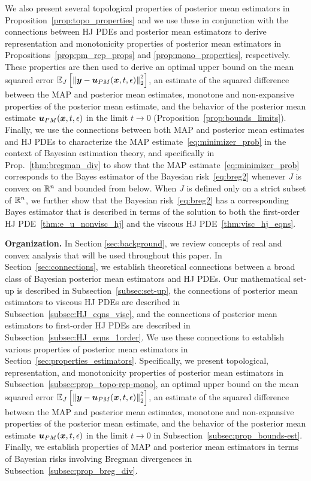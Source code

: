 We also present several topological properties of posterior mean estimators in Proposition~\ref{prop:topo_properties} and we use these in conjunction with the connections between HJ PDEs and posterior mean estimators to derive representation and monotonicity properties of posterior mean estimators in Propositions~\ref{prop:pm_rep_props} and \ref{prop:mono_properties}, respectively. These properties are then used to derive an optimal upper bound on the mean squared error $\mathbb{E}_{J}\left [{\left\Vert{\boldsymbol{y}-\boldsymbol{u}_{PM}(\boldsymbol{x},t,\epsilon)} \right\Vert_{2}^{2}}\right]$, an estimate of the squared difference between the MAP and posterior mean estimates, monotone and non-expansive properties of the posterior mean estimate, and the behavior of the posterior mean estimate $\boldsymbol{u}_{PM}(\boldsymbol{x},t,\epsilon)$ in the limit $t \to 0$ (Proposition~\ref{prop:bounds_limits}). Finally, we use the connections between both MAP and posterior mean estimates and HJ PDEs to characterize the MAP estimate~\eqref{eq:minimizer_prob} in the context of Bayesian estimation theory, and specifically in Prop.~\ref{thm:bregman_div} to show that the MAP estimate~\eqref{eq:minimizer_prob} corresponds to the Bayes estimator of the Bayesian risk~\eqref{eq:breg2} whenever $J$ is convex on $\mathbb{R}^n$ and bounded from below. When $J$ is defined only on a strict subset of $\mathbb{R}^n$, we further show that the Bayesian risk~\eqref{eq:breg2} has a corresponding Bayes estimator that is described in terms of the solution to both the first-order HJ PDE~\eqref{thm:e_u_nonvisc_hj} and the viscous HJ PDE~\eqref{thm:visc_hj_eqns}.

\bigbreak
\noindent
\textbf{Organization.} 
In Section \ref{sec:background}, we review concepts of real and convex analysis that will be used throughout this paper. In Section~\ref{sec:connections}, we establish theoretical connections between a broad class of Bayesian posterior mean estimators and HJ PDEs. Our mathematical set-up is described in Subsection~\ref{subsec:set-up}, the connections of posterior mean estimators to viscous HJ PDEs are described in Subsection~\ref{subsec:HJ_eqns_visc}, and the connections of posterior mean estimators to first-order HJ PDEs are described in Subsection~\ref{subsec:HJ_eqns_1order}. We use these connections to establish various properties of posterior mean estimators in Section~\ref{sec:properties_estimators}. Specifically, we present topological, representation, and monotonicity properties of posterior mean estimators in Subsection~\ref{subsec:prop_topo-rep-mono}, an optimal upper bound on the mean squared error $\mathbb{E}_{J}\left [{\left\Vert{\boldsymbol{y}-\boldsymbol{u}_{PM}(\boldsymbol{x},t,\epsilon)} \right\Vert_{2}^{2}}\right]$, an estimate of the squared difference between the MAP and posterior mean estimates, monotone and non-expansive properties of the posterior mean estimate, and the behavior of the posterior mean estimate $\boldsymbol{u}_{PM}(\boldsymbol{x},t,\epsilon)$ in the limit $t \to 0$ in Subsection~\ref{subsec:prop_bounds-est}. Finally, we establish properties of MAP and posterior mean estimators in terms of Bayesian risks involving Bregman divergences in Subsection~\ref{subsec:prop_breg_div}.